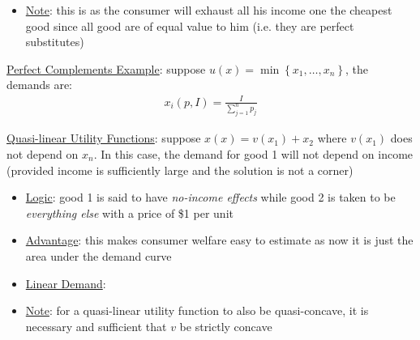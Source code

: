 \documentclass{article}
\begin{document}
  \par
  \begin{itemize}
    \item  \underline{Note}: this is as the consumer will exhaust all his income one the cheapest good since all good are of equal value to him (i.e. they are perfect substitutes)
  \end{itemize}
  \par
  \underline{Perfect Complements Example}: suppose $u(x) = \min \left\{x_{1}, \dots, x_{n} \right\}$, the demands are:
  \begin{gather*}
    x_{i}(p,I) = \frac{I}{\sum_{j=1}^{n}p_{j}}
  \end{gather*}
  \par
  \underline{Quasi-linear Utility Functions}: suppose $x(x) = v(x_{1}) + x_{2}$ where $v(x_{1})$ does not depend on $x_{n}$. In this case, the demand for good 1 will not depend on income (provided income is sufficiently large and the solution is not a corner)
  \begin{itemize}
    \item  \underline{Logic}: good 1 is said to have \textit{no-income effects} while good 2 is taken to be \textit{everything else} with a price of \$1 per unit
    \item  \underline{Advantage}: this makes consumer welfare easy to estimate as now it is just the area under the demand curve
    \item  \underline{Linear Demand}: %
    \item  \underline{Note}: for a quasi-linear utility function to also be quasi-concave, it is necessary and sufficient that $v$ be strictly concave
  \end{itemize}
  \par
\vspace{6mm}
\end{document}

